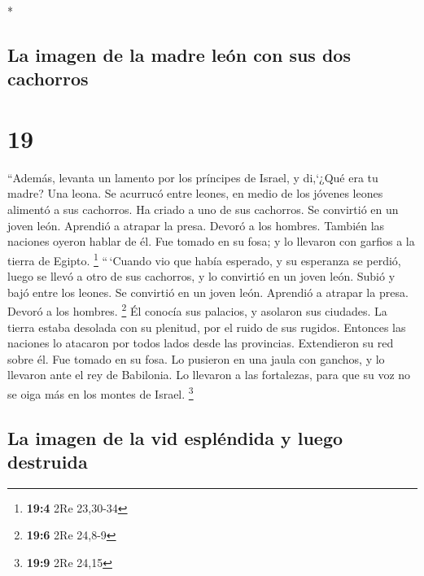 \begin{paracol}{2}
\begin{otherlanguage}{english}
\end{otherlanguage}

\switchcolumn[0]*

\hypertarget{la-imagen-de-la-madre-leuxf3n-con-sus-dos-cachorros}{%
\subsection{La imagen de la madre león con sus dos
cachorros}\label{la-imagen-de-la-madre-leuxf3n-con-sus-dos-cachorros}}

\hypertarget{section-36}{%
\section{19}\label{section-36}}

 ``Además, levanta un lamento por los príncipes de Israel,
 y di,`¿Qué era tu madre? Una leona. Se acurrucó entre
leones, en medio de los jóvenes leones alimentó a sus cachorros.
 Ha criado a uno de sus cachorros. Se convirtió en un
joven león. Aprendió a atrapar la presa. Devoró a los hombres.
 También las naciones oyeron hablar de él. Fue tomado en
su fosa; y lo llevaron con garfios a la tierra de Egipto. \footnote{\textbf{19:4}
  2Re 23,30-34}  ``\,`Cuando vio que había esperado, y su
esperanza se perdió, luego se llevó a otro de sus cachorros, y lo
convirtió en un joven león.  Subió y bajó entre los
leones. Se convirtió en un joven león. Aprendió a atrapar la presa.
Devoró a los hombres. \footnote{\textbf{19:6} 2Re 24,8-9} 
Él conocía sus palacios, y asolaron sus ciudades. La tierra estaba
desolada con su plenitud, por el ruido de sus rugidos. 
Entonces las naciones lo atacaron por todos lados desde las provincias.
Extendieron su red sobre él. Fue tomado en su fosa.  Lo
pusieron en una jaula con ganchos, y lo llevaron ante el rey de
Babilonia. Lo llevaron a las fortalezas, para que su voz no se oiga más
en los montes de Israel. \footnote{\textbf{19:9} 2Re 24,15}

\hypertarget{la-imagen-de-la-vid-espluxe9ndida-y-luego-destruida}{%
\subsection{La imagen de la vid espléndida y luego
destruida}\label{la-imagen-de-la-vid-espluxe9ndida-y-luego-destruida}}


\end{paracol}
